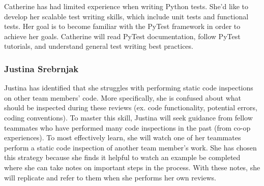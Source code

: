 \documentclass[12pt, titlepage]{article}
\begin{document}
	Catherine has had limited experience when writing Python tests. She'd like to develop her scalable test writing skills, which include unit tests and functional tests. Her goal is to become familiar with the PyTest framework in order to achieve her goals. Catherine will read PyTest documentation, follow PyTest tutorials, and understand general test writing best practices.
	
	\subsubsection*{Justina Srebrnjak}
	Justina has identified that she struggles with performing static code inspections on other team members' code. More specifically, she is confused about what should be inspected during these reviews (ex. code functionality, potential errors, coding conventions). To master this skill, Justina will seek guidance from fellow teammates who have performed many code inspections in the past (from co-op experiences). To most effectively learn, she will watch one of her teammates perform a static code inspection of another team member's work. She has chosen this strategy because she finds it helpful to watch an example be completed where she can take notes on important steps in the process. With these notes, she will replicate and refer to them when she performs her own reviews.
	
\end{document}

